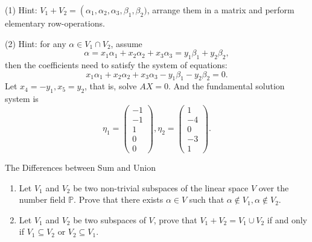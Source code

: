 \begin{solution}
  (1) Hint: $V_1 + V_2 = \operatorname(\alpha_1, \alpha_2, \alpha_3, \beta_1,
  \beta_2)$,
  arrange them in a matrix and perform elementary row-operations.

  (2) Hint: for any $\alpha \in V_1 \cap V_2$,
  assume
  \begin{equation}
    \alpha = x_1 \alpha_1 + x_2 \alpha_2 + x_3 \alpha_3 = y_1 \beta_1 + y_2 \beta_2,
  \end{equation}
  then the coefficients need to satisfy the system of equations:
  \begin{equation}
    x_1 \alpha_1 + x_2 \alpha_2 + x_3 \alpha_3 - y_1 \beta_1 - y_2 \beta_2 = 0.
  \end{equation}
  Let $x_4 = -y_1, x_5 = y_2$, that is, solve $AX = 0$.
  And the fundamental solution system is
  \begin{equation}
    \left.\eta_1=\left(\begin{array}{c}-1\\-1\\1\\0\\0\end{array}\right.\right),\eta_2=\left( \begin{array}{c}1\\-4\\0\\-3\\1\end{array} \right).
  \end{equation}
\end{solution}

\begin{example}{The Differences between Sum and Union}{}
  \begin{enumerate}
  \item Let $V_1$ and $V_2$ be two non-trivial subspaces of the linear space $V$ over
    the number field $\mathbb{P}$. Prove that there exists $\alpha \in V$ such that
    $\alpha \not\in V_1, \alpha \not \in V_2$.
  \item Let $V_1$ and $V_2$ be two subspaces of $V$,
    prove that $V_1 + V_2 = V_1 \cup V_2$ if and only if $V_1 \subseteq V_2$ or
    $V_2 \subseteq V_1$.
  \end{enumerate}
\end{example}

